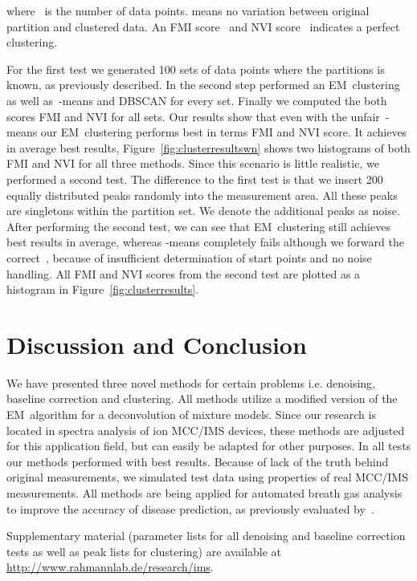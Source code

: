 \documentclass{article}
\begin{document}
where~ is the number of data points.
 means no variation between original partition and clustered data.
An FMI score~ and NVI score~ indicates a perfect clustering.

For the first test we generated 100 sets of data points where the partitions is known, as previously described.
In the second step performed an EM~clustering as well as~-means and DBSCAN for every set.
Finally we computed the both scores FMI and NVI for all sets.
Our results show that even with the unfair~-means our EM~clustering performs best in terms FMI and NVI score.
It achieves in average best results, Figure~\ref{fig:clusterresultswn} shows two histograms of both FMI and NVI for all three methods.
Since this scenario is little realistic, we performed a second test.
The difference to the first test is that we insert 200 equally distributed peaks randomly into the measurement area.
All these peaks are singletons within the partition set.
We denote the additional peaks as noise.
After performing the second test, we can see that EM~clustering still achieves best results in average, whereas  -means completely fails although we forward the correct~, because of insufficient determination of start points and no noise handling.
All FMI and NVI scores from the second test are plotted as a histogram in Figure~\ref{fig:clusterresults}.





\section{Discussion and Conclusion}
\label{sec:discussion}

We have presented three novel methods for certain problems i.e. denoising, baseline correction and clustering.
All methods utilize a modified version of the EM~algorithm for a deconvolution of mixture models.
Since our research is located in spectra analysis of ion MCC/IMS devices, these methods are adjusted for this application field, but can easily be adapted for other purposes.
In all tests our methods performed with best results.
Because of lack of the truth behind original measurements, we simulated test data using properties of real MCC/IMS measurements.
All methods are being applied for automated breath gas analysis to improve the accuracy of disease prediction, as previously evaluated by~\cite{hauschild2013eval}.

Supplementary material (parameter lists for all denoising and baseline correction tests as well as peak lists for clustering) are available at \url{http://www.rahmannlab.de/research/ims}.
\end{document}
